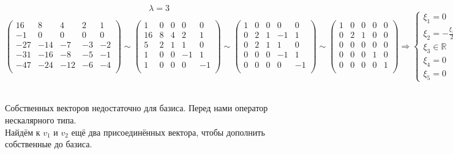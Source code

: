 \documentclass{article}
\newcommand{\la}{\lambda}
\begin{document}
$$\la = 3$$
$$\left(\begin{matrix}
16 & 8 & 4 & 2 & 1 \\
-1 & 0 & 0 & 0 & 0 \\
-27 & -14 & -7 & -3 & -2 \\
-31 & -16 & -8 & -5 & -1 \\
-47 & -24 & -12 & -6 & -4 \\
\end{matrix}\right) \sim \left(\begin{matrix}
1 & 0 & 0 & 0 & 0 \\
16 & 8 & 4 & 2 & 1 \\
5 & 2 & 1 & 1 & 0 \\
1 & 0 & 0 & -1 & 1 \\
1 & 0 & 0 & 0 & -1 \\
\end{matrix}\right) \sim \left(\begin{matrix}
1 & 0 & 0 & 0 & 0 \\
0 & 2 & 1 & -1 & 1 \\
0 & 2 & 1 & 1 & 0 \\
0 & 0 & 0 & -1 & 1 \\
0 & 0 & 0 & 0 & -1 \\
\end{matrix}\right) \sim \left(\begin{matrix}
1 & 0 & 0 & 0 & 0 \\
0 & 2 & 1 & 0 & 0 \\
0 & 0 & 0 & 0 & 0 \\
0 & 0 & 0 & 1 & 0 \\
0 & 0 & 0 & 0 & 1 \\
\end{matrix}\right) \Rightarrow \begin{cases}
\xi_1 = 0 \\ \xi_2 = -\frac{\xi_3}{2} \\ \xi_3 \in \mathbb{R} \\ \xi_4 = 0 \\ \xi_5 = 0
\end{cases} \Rightarrow v_3 = \begin{pmatrix}
0 \\ -1 \\ 2 \\ 0 \\ 0
\end{pmatrix}$$ \\
\begin{center}
Собственных векторов недостаточно для базиса. Перед нами оператор нескалярного типа. \\
Найдём к $v_1$ и $v_2$ ещё два присоединённых вектора, чтобы дополнить собственные до базиса.
\end{center}
\end{document}

